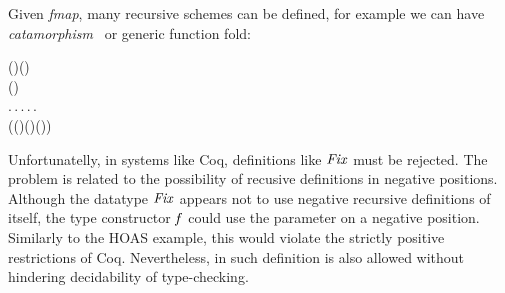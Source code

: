 Given \emph{fmap}, many recursive schemes can be defined, for example
we can have \emph{catamorphism}~\cite{Meijer1991} or generic function fold:
\begin{hscode}\SaveRestoreHook
{}%
%
%
%
%
%
\>[3]{}\;\mathbin{:}{}\<[18]%
\>[18]{}(\mathbin{:}\star\to \star)\to (\mathbin{:}\star)\to {}\<[E]%
\\
\>[18]{}\;\to (\;\to {})\to {}\;\to {}\mathrel{=}{}\<[E]%
\\
\>[3]{}\<[5]%
\>[5]{}\lambda {}\mathbin{:}\star\to \star.\,\lambda {}\mathbin{:}\star.\,\lambda {}\mathbin{:}\;.\,\lambda {}\mathbin{:}\;\to {}.\,\lambda {}\mathbin{:}\;.\,{}\<[E]%
\\
\>[5]{}\<[7]%
\>[7]{}\;(\;\;\;(\;)\;\;(\;\;\;\;)\;(\;\;)){}\<[E]%
\ColumnHook
\end{hscode}\resethooks
{}
Unfortunatelly, in systems like Coq, definitions like \ensuremath{\Conid{Fix}}
must be rejected. The problem is related to the possibility
of recusive definitions in negative positions. Although the
datatype \ensuremath{\Conid{Fix}} appears not to use negative recursive definitions
of itself, the type constructor \ensuremath{\Varid{f}} could use the parameter
on a negative position.
Similarly to the HOAS example,
this would violate the strictly positive restrictions of Coq.
Nevertheless, in \sufcc such definition is also allowed
without hindering decidability of type-checking.



\begin{comment}
Note that now we can use the above \emph{Nat} anywhere, including the
left-hand side of a function arrow, which is a potential source of
non-termination. The termination checker of Coq or Agda is so
conservative that it would reject the definition of
\emph{Fix} to avoid the above situation.
However in \sufcc, where type-level computation is
explicitly controlled, we can safely use \emph{Fix} in the program.
\end{comment}

